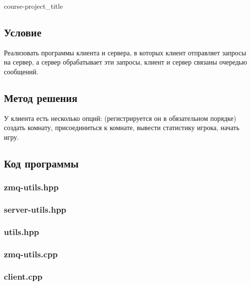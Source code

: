 \documentclass[12pt]{article}
\begin{document}
	
	{course-project_title}
	
	\subsection*{Условие}
	
	Реализовать программы клиента и сервера, в которых клиент отправляет запросы на сервер, а сервер обрабатывает эти запросы, клиент и сервер связаны очередью сообщений.	
	
	\subsection*{Метод решения}
	
	У клиента есть несколько опций: (регистрируется он в обязательном порядке) создать комнату, присоединиться к комнате, вывести статистику игрока, начать игру. 
	
	\subsection*{Код программы}
	
	\subsubsection*{zmq-utils.hpp}
	
	
	
	\subsubsection*{server-utils.hpp}
	
	
	
	\subsubsection*{utils.hpp}
	
	
	
	\subsubsection*{zmq-utils.cpp}
	
	
	
	\subsubsection*{client.cpp}
	
\end{document}
